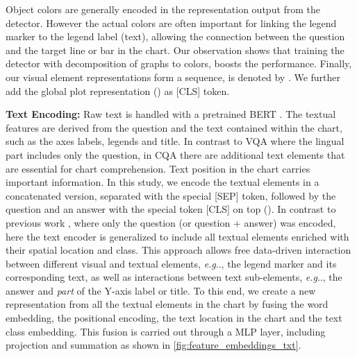 \documentclass[runningheads]{llncs}
\makeatletter
\DeclareRobustCommand\onedot{\futurelet\@let@token\@onedot}
\def\@onedot{\ifx\@let@token.\else.\null\fi\xspace}
\def\eg{\emph{e.g}\onedot} \def\Eg{\emph{E.g}\onedot}
\makeatother
\begin{document}
Object colors are generally encoded in the representation output from the detector. However the actual colors are often important for linking the legend marker to the legend label (text), allowing the connection between the question and the target line or bar in the chart. Our observation shows that training the detector with decomposition of graphs to colors, boosts the performance.
Finally, our visual element representations form a sequence, is denoted by .
We further add the global plot representation () as [CLS] token.

{\bf Text Encoding:} Raw text is handled with a pretrained BERT \cite{devlin2019bert}. The textual features are derived from the question and the text contained within the chart, such as the axes labels, legends and title. In contrast to VQA where the lingual part includes only the question, in CQA there are additional text elements that are essential for chart comprehension. Text position in the chart carries important information.
In this study, we encode the textual elements in a concatenated version, separated with the special [SEP] token, followed by the question and an answer with the special token [CLS] on top (). In contrast to previous work \cite{vilbert,chartqa, dvqa, figureqa, yang2016stacked}, where only the question (or question + answer) was encoded, here the text encoder is generalized to include all textual elements enriched with their spatial location and class. This approach allows free data-driven interaction between different visual and textual elements, \eg, the legend marker and its corresponding text, as well as interactions between text sub-elements, \eg, the answer and {\it part} of the Y-axis label or title. To this end, we create a new representation from all the textual elements in the chart by fusing the word embedding, the positional encoding, the text location in the chart and the text class embedding. This fusion is carried out through a MLP layer, including projection and summation as shown in \cref{fig:feature_embeddings_txt}. 
\end{document}
